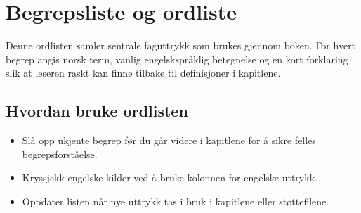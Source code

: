 \chapter{Begrepsliste og ordliste}
\label{appendix:ordliste}

Denne ordlisten samler sentrale faguttrykk som brukes gjennom boken. For hvert begrep angis norsk term, vanlig engelskspråklig
betegnelse og en kort forklaring slik at leseren raskt kan finne tilbake til definisjoner i kapitlene.

\section{Hvordan bruke ordlisten}
\begin{itemize}
    \item Slå opp ukjente begrep før du går videre i kapitlene for å sikre felles begrepsforståelse.
    \item Kryssjekk engelske kilder ved å bruke kolonnen for engelske uttrykk.
    \item Oppdater listen når nye uttrykk tas i bruk i kapitlene eller støttefilene.
\end{itemize}

